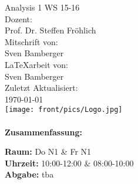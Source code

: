 \begin{titlepage}
\center
\Large Analysis 1 WS 15-16\large \\[2em]
Dozent:\\Prof. Dr. Steffen Fröhlich\\[2em]
Mitschrift von:\\Sven Bamberger\\[2em]
\LaTeX{arbeit} von:\\Sven Bamberger\\[2em]
Zuletzt Aktualisiert:\\\today\\
\texttt{[image: front/pics/Logo.jpg]}\\\quad\\
\Large \textbf{Zusammenfassung:}\\[1em]
\parbox{0.75\textwidth}{\large
\textbf{Raum:} Do N1 \& Fr N1\\
\textbf{Uhrzeit:} 10:00-12:00 \& 08:00-10:00\\
\textbf{Abgabe:} tba\\
}
\end{titlepage}
